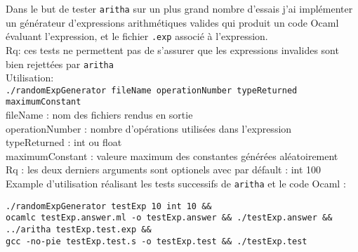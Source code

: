 \documentclass[11pt,a4paper]{article}
\begin{document}
Dans le but de tester \verb|aritha| sur un plus grand nombre d'essais j'ai implémenter un générateur d'expressions arithmétiques valides qui produit un code Ocaml évaluant l'expression, et le fichier \verb|.exp| associé à l'expression.\\
Rq: ces tests ne permettent pas de s'assurer que les expressions invalides sont bien rejettées par \verb|aritha|\\
\noindent Utilisation:\\

\noindent \verb|./randomExpGenerator fileName operationNumber typeReturned maximumConstant|\\

\noindent fileName : nom des fichiers rendus en sortie\\
operationNumber : nombre d'opérations utilisées dans l'expression\\
typeReturned : int ou float\\
maximumConstant : valeure maximum des constantes générées aléatoirement\\
Rq : les deux derniers arguments sont optionels avec par défault : int 100\\
Example d'utilisation réalisant les tests successifs de \verb|aritha| et le code Ocaml :
\begin{verbatim}
./randomExpGenerator testExp 10 int 10 &&
ocamlc testExp.answer.ml -o testExp.answer && ./testExp.answer &&
../aritha testExp.test.exp &&
gcc -no-pie testExp.test.s -o testExp.test && ./testExp.test
\end{verbatim}
\end{document}
